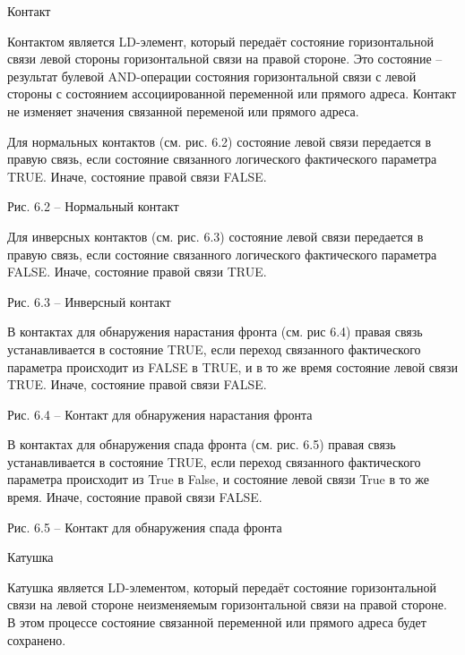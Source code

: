 \documentclass[letterpaper,10pt,russian]{sphinxmanual}
\begin{document}
Контакт

Контактом является LD-элемент, который передаёт состояние горизонтальной
связи левой стороны горизонтальной связи на правой стороне. Это
состояние – результат булевой AND-операции состояния горизонтальной
связи с левой стороны с состоянием ассоциированной переменной или
прямого адреса. Контакт не изменяет значения связанной переменой или
прямого адреса.

Для нормальных контактов (см. рис. 6.2) состояние левой связи передается
в правую связь, если состояние связанного логического фактического
параметра TRUE. Иначе, состояние правой связи FALSE.


Рис. 6.2 – Нормальный контакт

Для инверсных контактов (см. рис. 6.3) состояние левой связи передается
в правую связь, если состояние связанного логического фактического
параметра FALSE. Иначе, состояние правой связи TRUE.


Рис. 6.3 – Инверсный контакт

В контактах для обнаружения нарастания фронта (см. рис 6.4) правая связь
устанавливается в состояние TRUE, если переход связанного фактического
параметра происходит из FALSE в TRUE, и в то же время состояние левой
связи TRUE. Иначе, состояние правой связи FALSE.


Рис. 6.4 – Контакт для обнаружения нарастания фронта

В контактах для обнаружения спада фронта (см. рис. 6.5) правая связь
устанавливается в состояние TRUE, если переход связанного фактического
параметра происходит из True в False, и состояние левой связи True в то
же время. Иначе, состояние правой связи FALSE.


Рис. 6.5 – Контакт для обнаружения спада фронта

Катушка

Катушка является LD-элементом, который передаёт состояние горизонтальной
связи на левой стороне неизменяемым горизонтальной связи на правой
стороне. В этом процессе состояние связанной переменной или прямого
адреса будет сохранено.
\end{document}
